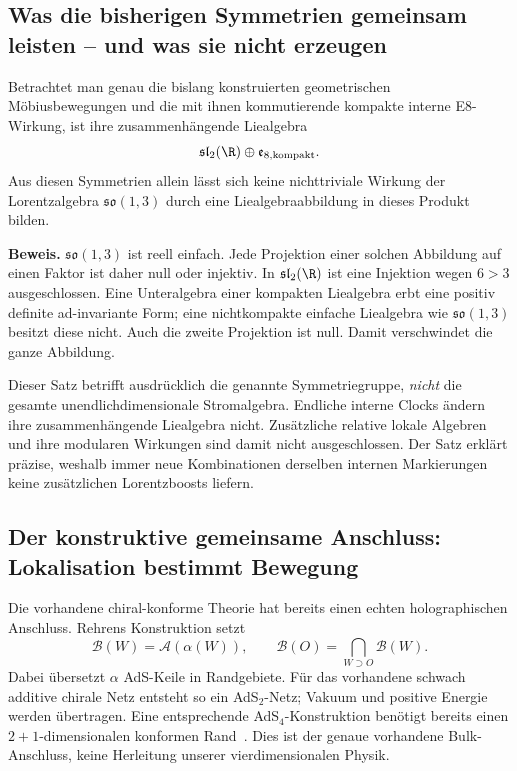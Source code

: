 
\subsection{Was die bisherigen Symmetrien gemeinsam leisten -- und was sie nicht erzeugen}
Betrachtet man genau die bislang konstruierten geometrischen Möbiusbewegungen und die mit ihnen kommutierende kompakte interne E8-Wirkung, ist ihre zusammenhängende Liealgebra
\begin{equation}
\mathfrak{sl}_2(\R)\oplus\mathfrak e_{8,\mathrm{kompakt}}.
\end{equation}
Aus diesen Symmetrien allein lässt sich keine nichttriviale Wirkung der Lorentzalgebra $\mathfrak{so}(1,3)$ durch eine Liealgebraabbildung in dieses Produkt bilden.

\textbf{Beweis.} $\mathfrak{so}(1,3)$ ist reell einfach. Jede Projektion einer solchen Abbildung auf einen Faktor ist daher null oder injektiv. In $\mathfrak{sl}_2(\R)$ ist eine Injektion wegen $6>3$ ausgeschlossen. Eine Unteralgebra einer kompakten Liealgebra erbt eine positiv definite ad-invariante Form; eine nichtkompakte einfache Liealgebra wie $\mathfrak{so}(1,3)$ besitzt diese nicht. Auch die zweite Projektion ist null. Damit verschwindet die ganze Abbildung.

Dieser Satz betrifft ausdrücklich die genannte Symmetriegruppe, \emph{nicht} die gesamte unendlichdimensionale Stromalgebra. Endliche interne Clocks ändern ihre zusammenhängende Liealgebra nicht. Zusätzliche relative lokale Algebren und ihre modularen Wirkungen sind damit nicht ausgeschlossen. Der Satz erklärt präzise, weshalb immer neue Kombinationen derselben internen Markierungen keine zusätzlichen Lorentzboosts liefern.

\subsection{Der konstruktive gemeinsame Anschluss: Lokalisation bestimmt Bewegung}
Die vorhandene chiral-konforme Theorie hat bereits einen echten holographischen Anschluss. Rehrens Konstruktion setzt
\begin{equation}
\mathcal B(W)=\mathcal A(\alpha(W)),\qquad
\mathcal B(O)=\bigcap_{W\supset O}\mathcal B(W).
\end{equation}
Dabei übersetzt $\alpha$ AdS-Keile in Randgebiete. Für das vorhandene schwach additive chirale Netz entsteht so ein AdS$_2$-Netz; Vakuum und positive Energie werden übertragen. Eine entsprechende AdS$_4$-Konstruktion benötigt bereits einen $2+1$-dimensionalen konformen Rand~\cite{rehren}. Dies ist der genaue vorhandene Bulk-Anschluss, keine Herleitung unserer vierdimensionalen Physik.

